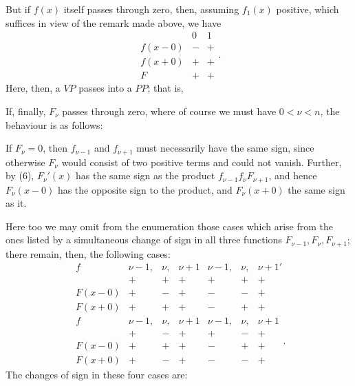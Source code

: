 

But if $f(x)$ itself passes through zero, then, assuming $f_1(x)$ positive, which suffices in view of the remark made above, we have
\[
\begin{array}{c|cc}
 & 0 & 1 \\ \hline
f(x-0) & - & + \\
f(x+0) & + & + \\ \hline
F & + & +
\end{array}
\text{.}
\]
Here, then, a $VP$ passes into a $PP$; that is, 

If, finally, $F_\nu$ passes through zero, where of course we must have $0 < \nu < n$, the behaviour is as follows:

If $F_\nu = 0$, then $f_{\nu-1}$ and $f_{\nu+1}$ must necessarily have the same sign, since otherwise $F_\nu$ would consist of two positive terms and could not vanish. Further, by (6), $F_\nu'(x)$ has the same sign as the product $f_{\nu-1} f_\nu F_{\nu+1}$, and hence $F_\nu(x-0)$ has the opposite sign to the product, and $F_\nu(x+0)$ the same sign as it.

Here too we may omit from the enumeration those cases which arise from the ones listed by a simultaneous change of sign in all three functions $F_{\nu-1}, F_\nu, F_{\nu+1}$; there remain, then, the following cases:
\[
\begin{array}{c|ccc||ccc}
f & \nu-1, & \nu, & \nu+1 & \nu-1, & \nu, & \nu+1' \\
 & + & + & + & + & + & + \\ \hline
F(x-0) & + & - & + & - & - & + \\ \hline
F(x+0) & + & + & + & - & + & +
\end{array}
\]
\[
\begin{array}{c|ccc||ccc}
f & \nu-1, & \nu, & \nu+1 & \nu-1, & \nu, & \nu+1 \\
 & + & - & + & + & - & + \\ \hline
F(x-0) & + & + & + & - & + & + \\ \hline
F(x+0) & + & - & + & - & - & +
\end{array}
\text{.}
\]
The changes of sign in these four cases are:

